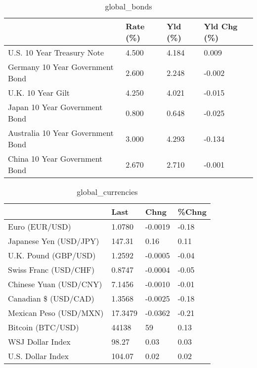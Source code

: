 \documentclass{article}%
\begin{document}
%


\begin{table}[htbp]%
\caption{global\_bonds}%
\centering%
\begin{adjustbox}{width=1\textwidth}%
\begin{tabular}{llll}
\toprule
                                  & Rate (\%) & Yld (\%) & Yld Chg (\%) \\
\midrule
       U.S. 10 Year Treasury Note &    4.500 &   4.184 &       0.009 \\
  Germany 10 Year Government Bond &    2.600 &   2.248 &      -0.002 \\
                U.K. 10 Year Gilt &    4.250 &   4.021 &      -0.015 \\
    Japan 10 Year Government Bond &    0.800 &   0.648 &      -0.025 \\
Australia 10 Year Government Bond &    3.000 &   4.293 &      -0.134 \\
    China 10 Year Government Bond &    2.670 &   2.710 &      -0.001 \\
\bottomrule
\end{tabular}
%
\end{adjustbox}%
\end{table}

%


\begin{table}[htbp]%
\caption{global\_currencies}%
\centering%
\begin{adjustbox}{width=1\textwidth}%
\begin{tabular}{llll}
\toprule
                       &    Last &    Chng & \%Chng \\
\midrule
        Euro (EUR/USD) &  1.0780 & -0.0019 & -0.18 \\
Japanese Yen (USD/JPY) &  147.31 &    0.16 &  0.11 \\
  U.K. Pound (GBP/USD) &  1.2592 & -0.0005 & -0.04 \\
 Swiss Franc (USD/CHF) &  0.8747 & -0.0004 & -0.05 \\
Chinese Yuan (USD/CNY) &  7.1456 & -0.0010 & -0.01 \\
  Canadian \$ (USD/CAD) &  1.3568 & -0.0025 & -0.18 \\
Mexican Peso (USD/MXN) & 17.3479 & -0.0362 & -0.21 \\
     Bitcoin (BTC/USD) &   44138 &      59 &  0.13 \\
      WSJ Dollar Index &   98.27 &    0.03 &  0.03 \\
     U.S. Dollar Index &  104.07 &    0.02 &  0.02 \\
\bottomrule
\end{tabular}
%
\end{adjustbox}%
\end{table}
\end{document}
